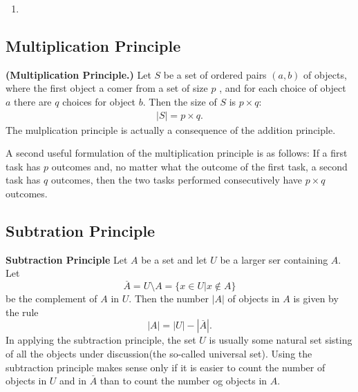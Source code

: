 \begin{example}
    \hspace{0mm}
    \begin{enumerate}
        \item
    \end{enumerate}
\end{example}

\subsection{Multiplication Principle}

\begin{definition}{\bf (Multiplication Principle.)}
    Let $S$ be a set of ordered pairs $(a,b)$ of objects, where the first object a comer from a set of size $p$
    , and for each choice of object $a$ there are $q$ choices for object $b$. Then the size of $S$ is $p\times q$:
    \begin{align}
        |S| = p\times q.
    \end{align}
    The mulplication principle is actually a consequence of the addition principle.

    A second useful formulation of the multiplication principle is as follows: If a first
    task has $p$ outcomes and, no matter what the outcome of the first task, a second task
    has $q$ outcomes, then the two tasks performed consecutively have $p \times q$ outcomes.
\end{definition}


\subsection{Subtration Principle}

\begin{definition}{\bf Subtraction Principle}
    Let $A$ be a set and let $U$ be a larger ser containing $A$. Let 
    $$ \overset{\_}{A} = U\setminus A = \{x\in U| x\notin A\}$$
    be the complement of $A$ in $U$. Then the number $|A|$  of objects in $A$ is given by the rule 
    $$ |A| = |U| - |\overset{\_}{A}|.$$
    In applying the subtraction principle, the set $U$ is usually some natural set sisting of all the objects under 
    discussion(the so-called universal set). Using the subtraction principle makes sense only if it is easier to count 
    the number of objects in $U$ and in $\overset{\_}{A}$ than to count the number og objects in $A$.
\end{definition}

